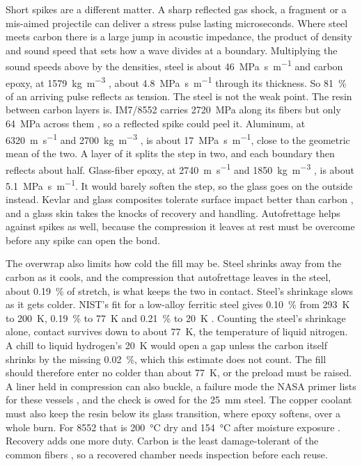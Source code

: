 \documentclass{article}
\begin{document}
Short spikes are a different matter. A sharp reflected gas shock, a fragment or a mis-aimed projectile can deliver a stress pulse lasting microseconds. Where steel meets carbon there is a large jump in acoustic impedance, the product of density and sound speed that sets how a wave divides at a boundary. Multiplying the sound speeds above by the densities, steel is about \SI{46}{\mega\pascal\second\per\meter} and carbon epoxy, at \SI{1579}{\kilogram\per\cubic\meter} \cite{alexander2012_cfrp_planar_impact}, about \SI{4.8}{\mega\pascal\second\per\meter} through its thickness. So \SI{81}{\percent} of an arriving pulse reflects as tension. The steel is not the weak point. The resin between carbon layers is. IM7/8552 carries \SI{2720}{\mega\pascal} along its fibers but only \SI{64}{\mega\pascal} across them \cite{hexcel_8552_datasheet}, so a reflected spike could peel it. Aluminum, at \SI{6320}{\meter\per\second} \cite{evident_sound_velocities} and \SI{2700}{\kilogram\per\cubic\meter} \cite{crc_handbook}, is about \SI{17}{\mega\pascal\second\per\meter}, close to the geometric mean of the two. A layer of it splits the step in two, and each boundary then reflects about half. Glass-fiber epoxy, at \SI{2740}{\meter\per\second} and \SI{1850}{\kilogram\per\cubic\meter} \cite{evident_sound_velocities,accurate_acculam_g10}, is about \SI{5.1}{\mega\pascal\second\per\meter}. It would barely soften the step, so the glass goes on the outside instead. Kevlar and glass composites tolerate surface impact better than carbon \cite{mclaughlan2011_copv_primer}, and a glass skin takes the knocks of recovery and handling. Autofrettage helps against spikes as well, because the compression it leaves at rest must be overcome before any spike can open the bond.

The overwrap also limits how cold the fill may be. Steel shrinks away from the carbon as it cools, and the compression that autofrettage leaves in the steel, about \SI{0.19}{\percent} of stretch, is what keeps the two in contact. Steel's shrinkage slows as it gets colder. NIST's fit for a low-alloy ferritic steel gives \SI{0.10}{\percent} from \SI{293}{\kelvin} to \SI{200}{\kelvin}, \SI{0.19}{\percent} to \SI{77}{\kelvin} and \SI{0.21}{\percent} to \SI{20}{\kelvin} \cite{nist_cryo_fe225ni}. Counting the steel's shrinkage alone, contact survives down to about \SI{77}{\kelvin}, the temperature of liquid nitrogen. A chill to liquid hydrogen's \SI{20}{\kelvin} would open a gap unless the carbon itself shrinks by the missing \SI{0.02}{\percent}, which this estimate does not count. The fill should therefore enter no colder than about \SI{77}{\kelvin}, or the preload must be raised. A liner held in compression can also buckle, a failure mode the NASA primer lists for these vessels \cite{mclaughlan2011_copv_primer}, and the check is owed for the \SI{25}{\milli\meter} steel. The copper coolant must also keep the resin below its glass transition, where epoxy softens, over a whole burn. For 8552 that is \SI{200}{\celsius} dry and \SI{154}{\celsius} after moisture exposure \cite{hexcel_8552_datasheet}. Recovery adds one more duty. Carbon is the least damage-tolerant of the common fibers \cite{mclaughlan2011_copv_primer}, so a recovered chamber needs inspection before each reuse.
\end{document}
